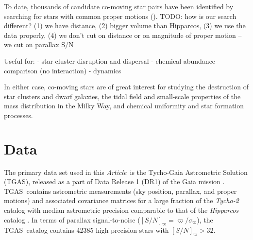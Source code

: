 \documentclass[manuscript, letterpaper]{aastex6}
\newcommand{\project}[1]{\textsl{#1}}
\newcommand{\acronym}[1]{{\small{#1}}}
\newcommand{\documentname}{\textsl{Article}}
\newcommand{\dr}{\acronym{DR1}}
\newcommand{\tgas}{\acronym{TGAS}}
\newcommand{\kms}{\ensuremath{\rm km~s^{-1}}}
\newcommand{\snr}{[S/N]_\varpi}
\newcommand{\todo}[1]{{\color{red}TODO: #1}}
\begin{document}
To date, thousands of candidate co-moving star pairs have been identified by
searching for stars with common proper motions (\citealt{Luyten:1979,
Poveda:1994, Allen:2000, Gould:2003, Chaname:2004, Lepine:2007,
Alonso-Floriano:2015}). \todo{how is our search different? (1) we have distance, (2) bigger volume than Hipparcos, (3) we use the data properly, (4) we don't cut on distance or on magnitude of proper motion -- we cut on parallax S/N}



Useful for:
- star cluster disruption and dispersal
- chemical abundance comparison (no interaction)
- dynamics

In either case, co-moving stars are of great interest
for studying the destruction of star clusters and dwarf galaxies, the tidal
field and small-scale properties of the mass distribution in the Milky Way, and
chemical uniformity and star formation processes.

\section{Data} \label{sec:data}

The primary data set used in this \documentname\ is the Tycho-Gaia Astrometric
Solution (\tgas), released as a part of Data Release 1 (\dr) of the Gaia mission
\citep{2016arXiv160904172G,2016arXiv160904303L}.
\tgas\ contains astrometric measurements (sky position,
parallax, and proper motions) and associated covariance matrices for a large
fraction of the \project{Tycho-2} catalog \citep{2000A&A...355L..27H} with median
astrometric precision comparable to that of the \project{Hipparcos} catalog
\citep[$\approx 0.3~{\rm mas}$;][]{2007ASSL..350.....V}. In terms of parallax
signal-to-noise ($\snr = \varpi/\sigma_\varpi$), the \tgas\ catalog contains
42385 high-precision stars with $\snr > 32$.
\end{document}
